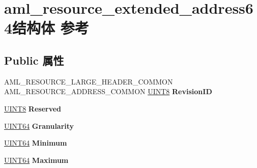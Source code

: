 \hypertarget{structaml__resource__extended__address64}{}\section{aml\+\_\+resource\+\_\+extended\+\_\+address64结构体 参考}
\label{structaml__resource__extended__address64}
\subsection*{Public 属性}
\begin{DoxyCompactItemize}
\item 
\mbox{\label{structaml__resource__extended__address64_a144ce2255c8aeb45546ddf6245a39058}} 
A\+M\+L\+\_\+\+R\+E\+S\+O\+U\+R\+C\+E\+\_\+\+L\+A\+R\+G\+E\+\_\+\+H\+E\+A\+D\+E\+R\+\_\+\+C\+O\+M\+M\+ON A\+M\+L\+\_\+\+R\+E\+S\+O\+U\+R\+C\+E\+\_\+\+A\+D\+D\+R\+E\+S\+S\+\_\+\+C\+O\+M\+M\+ON \hyperlink{_processor_bind_8h_ab27e9918b538ce9d8ca692479b375b6a}{U\+I\+N\+T8} {\bfseries Revision\+ID}
\item 
\mbox{\label{structaml__resource__extended__address64_a1ab17196c41cfdad8194e34c0781091d}} 
\hyperlink{_processor_bind_8h_ab27e9918b538ce9d8ca692479b375b6a}{U\+I\+N\+T8} {\bfseries Reserved}
\item 
\mbox{\label{structaml__resource__extended__address64_ad17559cfeaa2ba58a461464678f61435}} 
\hyperlink{_processor_bind_8h_a57be03562867144161c1bfee95ca8f7c}{U\+I\+N\+T64} {\bfseries Granularity}
\item 
\mbox{\label{structaml__resource__extended__address64_a27530f950fcbedf494ad8c0cb245d39f}} 
\hyperlink{_processor_bind_8h_a57be03562867144161c1bfee95ca8f7c}{U\+I\+N\+T64} {\bfseries Minimum}
\item 
\mbox{\label{structaml__resource__extended__address64_a4bbae5647d626cd77ae7069c9fdcd7ca}} 
\hyperlink{_processor_bind_8h_a57be03562867144161c1bfee95ca8f7c}{U\+I\+N\+T64} {\bfseries Maximum}
\item 
\mbox{\label{structaml__resource__extended__address64_a26754a03395fb9eafdd11604d83b3738}} 

\end{DoxyCompactItemize}
